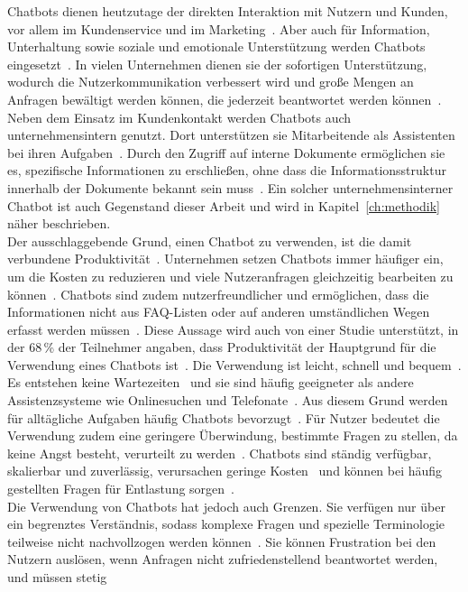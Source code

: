 Chatbots dienen heutzutage der direkten Interaktion mit Nutzern und Kunden, vor allem im Kundenservice und im Marketing~\cite[377]{cb02}. Aber auch für Information,
Unterhaltung sowie soziale und emotionale Unterstützung werden Chatbots eingesetzt~\cite[379]{cb02}. In vielen Unternehmen dienen sie der sofortigen Unterstützung, wodurch
die Nutzerkommunikation verbessert wird und große Mengen an Anfragen bewältigt werden können, die jederzeit beantwortet werden können~\cite[3004]{cb01}. 
Neben dem Einsatz im Kundenkontakt werden Chatbots auch unternehmensintern genutzt. Dort unterstützen sie Mitarbeitende als
Assistenten bei ihren Aufgaben~\cite[6]{cb16}. Durch den Zugriff auf interne Dokumente ermöglichen sie es, spezifische Informationen
zu erschließen, ohne dass die Informationsstruktur innerhalb der Dokumente bekannt sein muss~\cite[4]{cb16}.
Ein solcher unternehmensinterner Chatbot ist auch Gegenstand dieser Arbeit und wird in Kapitel~\ref{ch:methodik} näher beschrieben. \\
Der ausschlaggebende Grund, einen Chatbot zu verwenden, ist die damit verbundene Produktivität~\cite[1]{cb11}. Unternehmen setzen Chatbots immer häufiger ein, um die Kosten
zu reduzieren und viele Nutzeranfragen gleichzeitig bearbeiten zu können~\cite[1]{cb11}. Chatbots sind zudem nutzerfreundlicher und ermöglichen, dass die 
Informationen
nicht aus FAQ-Listen oder auf anderen umständlichen Wegen erfasst werden müssen~\cite[1]{cb11}. Diese Aussage wird auch von einer Studie unterstützt, in der 
68\,\% der Teilnehmer angaben, dass Produktivität der Hauptgrund für die Verwendung eines Chatbots ist~\cite[383]{cb02}. Die Verwendung ist leicht, schnell und bequem~\cite[383]{cb02}.
Es entstehen keine Wartezeiten~\cite[384]{cb02} und sie sind häufig geeigneter als andere Assistenzsysteme wie Onlinesuchen und Telefonate~\cite[379]{cb02}. Aus diesem
Grund werden für alltägliche Aufgaben häufig Chatbots bevorzugt~\cite[385]{cb02}. Für Nutzer bedeutet die Verwendung zudem eine geringere Überwindung, bestimmte 
Fragen zu stellen, da keine Angst besteht, verurteilt zu werden~\cite[385]{cb02}. Chatbots sind ständig verfügbar, skalierbar und zuverlässig, verursachen geringe 
Kosten~\cite[3]{cb04} und können bei häufig gestellten Fragen für Entlastung sorgen~\cite[3004]{cb01}. \\
Die Verwendung von Chatbots hat jedoch auch Grenzen. Sie verfügen nur über ein begrenztes Verständnis, sodass komplexe Fragen und spezielle Terminologie 
teilweise nicht
nachvollzogen werden können~\cite[3004]{cb01}. Sie können Frustration bei den Nutzern auslösen, wenn Anfragen nicht zufriedenstellend beantwortet werden, und müssen stetig 
